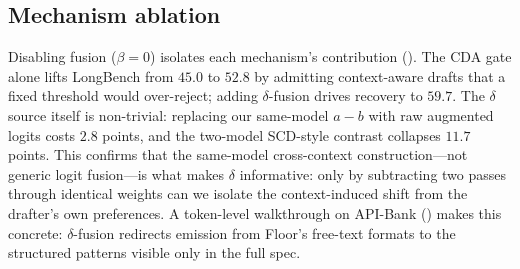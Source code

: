 \documentclass[11pt]{article}
\theoremstyle{plain}
\theoremstyle{definition}
\begin{document}


\subsection{Mechanism ablation}
\label{sec:ablation-mech}
Disabling fusion ($\beta{=}0$) isolates each mechanism's contribution (). The CDA gate alone lifts LongBench from $45.0$ to $52.8$ by admitting context-aware drafts that a fixed threshold would over-reject; adding $\delta$-fusion drives recovery to $59.7$. The $\delta$ source itself is non-trivial: replacing our same-model $a-b$ with raw augmented logits costs $2.8$ points, and the two-model SCD-style contrast collapses $11.7$ points. This confirms that the same-model cross-context construction---not generic logit fusion---is what makes $\delta$ informative: only by subtracting two passes through identical weights can we isolate the context-induced shift from the drafter's own preferences. A token-level walkthrough on API-Bank () makes this concrete: $\delta$-fusion redirects emission from Floor's free-text formats to the structured patterns visible only in the full spec.

\end{document}
